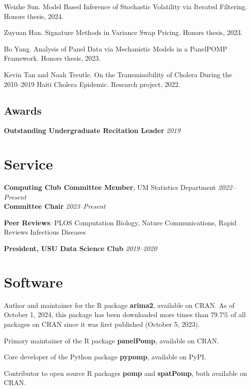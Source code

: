 \documentclass[11pt]{article}
\newenvironment {reflist}
                {
                 \begin{list}{}
                 {\setlength{\labelwidth}{0mm}
                  \setlength{\leftmargin}{8mm}
                  \setlength{\itemindent}{-3mm}
                  \setlength{\labelsep}{0mm}
                  \setlength{\parsep}{0.1 ex}
                  \setlength{\itemsep}{0.1cm}
      \setlength{\topsep}{0.15cm}}} %
   {\end{list}}
\begin{document}
\begin{reflist}

  \item Weizhe Sun. Model Based Inference of Stochastic Volatility via Iterated Filtering. Honors thesis, 2024.
  \item Zuyuan Han. Signature Methods in Variance Swap Pricing. Honors thesis, 2023.
  \item Bo Yang. Analysis of Panel Data via Mechanistic Models in a PanelPOMP Framework. Honors thesis, 2023.
  \item Kevin Tan and Noah Treutle. On the Transmissibility of Cholera During the 2010--2019 Haiti Cholera Epidemic. Research project, 2022.

\end{reflist}

\subsection*{Awards}

\hspace{5mm}\textbf{Outstanding Undergraduate Recitation Leader} \hfill  {\textit{2019}}

\noindent\hspace{5mm}{\it USU Mathematics and Statistics Department}

\section*{Service}

\noindent \textbf{Computing Club Committee Member}, UM Statistics Department \hfill  {\textit{2022--Present}}\\
\noindent \textbf{Committee Chair} \hfill {\it 2023--Present}

\vspace{2mm}
\noindent \textbf{Peer Reviews}: PLOS Computation Biology, Nature Communications, Rapid Reviews Infectious Diseases

\vspace{2mm}
\noindent \textbf{President, USU Data Science Club} \hfill  {\textit{2019--2020}}

\section*{Software}

\noindent Author and maintainer for the R package \textbf{arima2}, available on CRAN. As of October 1, 2024, this package has been downloaded more times than $79.7\%$ of all packages on CRAN since it was first published (October 5, 2023).

\vspace{2mm}
\noindent Primary maintainer of the R package \textbf{panelPomp}, available on CRAN.

\vspace{2mm}
\noindent Core developer of the Python package \textbf{pypomp}, available on PyPI.

\vspace{2mm}
\noindent Contributor to open source R packages \textbf{pomp} and \textbf{spatPomp}, both available on CRAN.
\end{document}
